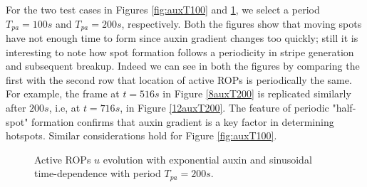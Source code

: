 For the two test cases in Figures \ref{fig:auxT100} and \ref{fig:auxT200}, we select a period $T_{pa} = 100s$ and $T_{pa} = 200s$, respectively. Both the figures show that moving spots have not enough time to form since auxin gradient changes too quickly; still it is interesting to note how spot formation follows a periodicity in stripe generation and subsequent breakup.  Indeed we can see in both the figures by comparing the first with the second row that location of active ROPs is periodically the same. For example, the frame at $t = 516s$ in Figure \ref{8auxT200} is replicated similarly after $200s$, i.e, at $t= 716s$, in Figure \ref{12auxT200}. The feature of periodic "half-spot" formation confirms that auxin gradient is a key factor in determining hotspots. Similar considerations hold for Figure \ref{fig:auxT100}.

\begin{figure}[t]
    \centering
    \quad
    \quad
    \quad
    \quad
    \quad
    \quad
    \quad
    \quad
    \caption[RR with time dependent auxin - period $T_{pa} = 200s$]{Active ROPs $u$ evolution with exponential auxin and sinusoidal time-dependence with period $T_{pa} = 200s$.}
    \label{fig:auxT200}
\end{figure}

